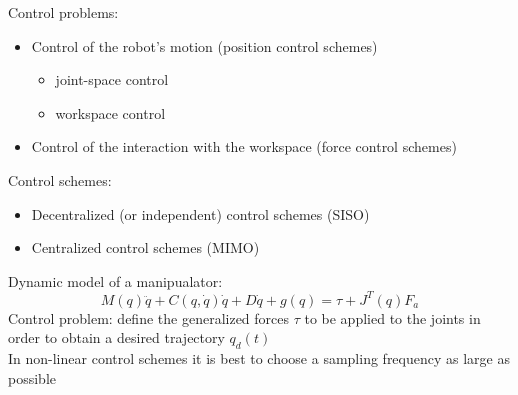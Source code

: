 \documentclass{book}
\begin{document}
Control problems:
\begin{itemize}
    \item Control of the robot's motion (position control schemes)
        \begin{itemize}
            \item joint-space control
            \item workspace control
        \end{itemize}
    \item Control of the interaction with the workspace (force control schemes)
\end{itemize}
Control schemes: 
\begin{itemize}
    \item Decentralized (or independent) control schemes (SISO)
    \item Centralized control schemes (MIMO)
\end{itemize}
Dynamic model of a manipualator:
\[
    M(q)\ddot{q}+C(q,\dot{q})\dot{q}+D\dot{q}+g(q) = \tau + J^T(q)F_a
\]
Control problem: define the generalized forces $\tau$ to be applied to the joints in order to obtain a desired trajectory $q_d(t)$\\
In non-linear control schemes it is best to choose a sampling frequency as large as possible
\end{document}
